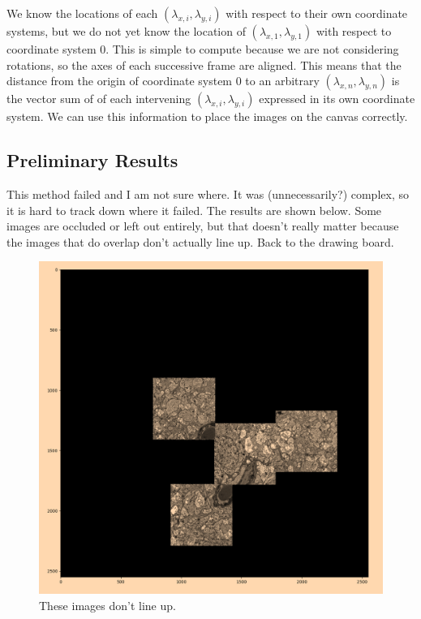 \documentclass[]{article}
\begin{document}
We know the locations of each $(\lambda_{x,i},\lambda_{y,i})$ with respect to their own coordinate systems, but we do not yet know the location of $(\lambda_{x,1},\lambda_{y,1})$ with respect to coordinate system 0. This is simple to compute because we are not considering rotations, so the axes of each successive frame are aligned. This means that the distance from the origin of coordinate system 0 to an arbitrary $(\lambda_{x,n},\lambda_{y,n})$ is the vector sum of of each intervening $(\lambda_{x,i},\lambda_{y,i})$ expressed in its own coordinate system. We can use this information to place the images on the canvas correctly.

\subsection{Preliminary Results}
This method failed and I am not sure where. It was (unnecessarily?) complex, so it is hard to track down where it failed. The results are shown below. Some images are occluded or left out entirely, but that doesn't really matter because the images that do overlap don't actually line up. Back to the drawing board.
\begin{figure}[H]
	\centering
	\includegraphics[width=6.5in]{failure_1.png}
	\caption{These images don't line up.}
\end{figure}
\end{document}
